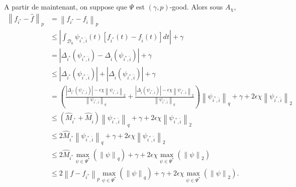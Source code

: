 \documentclass[11pt,letterpaper]{article}
\begin{document}
\par A partir de maintenant, on suppose que $\Psi$ est $\left( \gamma, p \right)$-good. Alors sous $A_\chi$,
\begin{equation}
	\begin{split}
		\left\| f_{i^*} - \hat{f} \right\|_p & = \left\| f_{i^*} - f_{\hat{i}} \right\|_p \\
		& \leq \left| \int_{\mathcal{D}_0}^{} \psi_{i^*, \hat{i}} \left( t \right) \left[ f_{i^*} \left( t \right) - f_{\hat{i}} \left( t \right) \right] dt \right| + \gamma \\
		& = \left| \Delta_{i^*} \left( \psi_{i^*, \hat{i}} \right) - \Delta_{\hat{i}} \left( \psi_{i^*, \hat{i}} \right) \right| + \gamma \\
		& \leq \left| \Delta_{i^*} \left( \psi_{i^*, \hat{i}} \right) \right| + \left| \Delta_{\hat{i}} \left( \psi_{i^*, \hat{i}} \right) \right| + \gamma \\
		&= \left( \frac{\left| \Delta_{i^*} \left( \psi_{i^*, \hat{i}} \right) \right| - \epsilon \chi \left\| \psi_{i^*, \hat{i}} \right\|_2}{\left\| \psi_{i^*, \hat{i}} \right\|_q} + \frac{\left| \Delta_{\hat{i}} \left( \psi_{i^*, \hat{i}} \right) \right| - \epsilon \chi \left\| \psi_{i^*, \hat{i}} \right\|_2}{\left\| \psi_{i^*, \hat{i}} \right\|_q} \right) \left\| \psi_{i^*, \hat{i}} \right\|_q + \gamma + 2 \epsilon \chi \left\| \psi_{i^*, \hat{i}} \right\|_2 \\
		& \leq \left( \hat{M}_{i^*} + \hat{M}_{\hat{i}} \right) \left\| \psi_{i^*, \hat{i}} \right\|_q + \gamma + 2 \epsilon \chi \left\| \psi_{i^*, \hat{i}} \right\|_2 \\
		& \leq 2 \hat{M}_{i^*} \left\| \psi_{i^*, \hat{i}} \right\|_q + \gamma + 2 \epsilon \chi \left\| \psi_{i^*, \hat{i}} \right\|_2 \\
		& \leq 2 \hat{M}_{i^*} \max\limits_{\psi \in \Psi^*} \left( \left\| \psi \right\|_q \right) + \gamma + 2 \epsilon \chi \max\limits_{\psi \in \Psi^*} \left( \left\| \psi \right\|_2 \right) \\
		& \leq 2 \left\| f - f_{i^*} \right\|_p \max\limits_{\psi \in \Psi^*} \left( \left\| \psi \right\|_q \right) + \gamma + 2 \epsilon \chi \max\limits_{\psi \in \Psi^*} \left( \left\| \psi \right\|_2 \right) .
	\end{split}
\end{equation}
\end{document}
